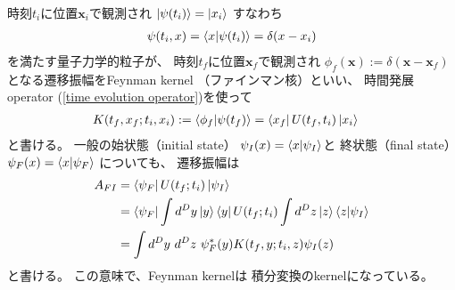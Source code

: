 時刻$t_i$に位置$\bm{x}_i$で観測され
$ \ket{ \psi(t_i) } = \ket{ x_i }$
すなわち
\begin{align}
    \psi(t_i, x)
    =
    \braket{ x | \psi(t_i) }
    =
    \delta( x - x_i )
\end{align}
を満たす量子力学的粒子が、
時刻$t_f$に位置$\bm{x}_f$で観測され
$\phi_f(\bm{x}) := \delta(\bm{x} - \bm{x}_f)$
となる遷移振幅をFeynman kernel
（ファインマン核）といい、
時間発展operator
(\ref{time evolution operator})を使って
\begin{align}
    K( t_f, x_f ; t_i, x_i )
&:=
    \braket{ \phi_f | \psi(t_f) }
=
    \bra{ x_f }
    U(t_f, t_i)
    \ket{ x_i }
\end{align}
と書ける。
一般の始状態（initial state）
$\psi_I( x ) = \braket{ x | \psi_I }$と
終状態（final state）
$\psi_F( x ) = \braket{ x | \psi_F }$
についても、
遷移振幅は
\begin{align}
    A_{FI}
    &=
    \bra{\psi_F}
        \hat{U} ( t_f ; t_i )
    \ket{\psi_I}
\notag\\&=
    \bra{\psi_F}
        \int d^D y
        \ket{ \bm{y} }
        \bra{ \bm{y} }
    \hat{U} ( t_f ; t_i )
        \int d^D z
        \ket{ \bm{z} }
    \braket{ \bm{z} | \psi_I}
\notag\\&=
    \int d^D y\ 
        d^D z\ 
    \psi_F^*( \bm{y} )
        K( t_f, \bm{y} ; t_i, \bm{z} )
    \psi_I  ( \bm{z} )
\label{transition amplitude with feynman kernel}
\end{align}
と書ける。
この意味で、Feynman kernelは
積分変換のkernelになっている。

